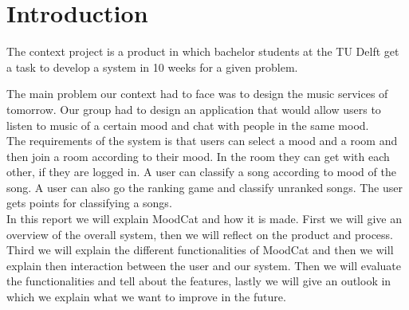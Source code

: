 \chapter{Introduction}

The context project is a product in which bachelor students at the TU Delft get a task to develop a system in 10 weeks for a given problem.

The main problem our context had to face was to design the music services of tomorrow.
Our group had to design an application that would allow users to listen to music of a certain mood and chat with people in the same mood.\\

The requirements of the system is that users can select a mood and a room and then join a room according to their mood.
In the room they can get with each other, if they are logged in.
A user can classify a song according to mood of the song.
A user can also go the ranking game and classify unranked songs.
The user gets points for classifying a songs.\\


In this report we will explain MoodCat and how it is made.
First we will give an overview of the overall system, then we will reflect on the product and process.
Third we will explain the different functionalities of MoodCat and then we will explain then interaction between the user and our system.
Then we will evaluate the functionalities and tell about the features, lastly we will give an outlook in which we explain what we want to improve in the future.